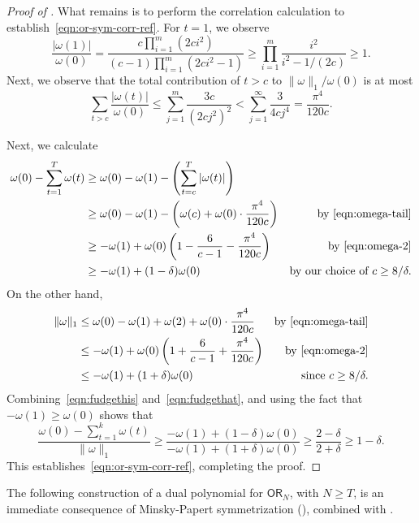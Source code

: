 \documentclass[11pt, letterpaper, fleqn]{article}
\theoremstyle{plain}
\newcommand{\OR}{\mathsf{ OR}}
\begin{document}
\begin{proof}[Proof of ]
What remains is to perform the correlation calculation to establish~\eqref{eqn:or-sym-corr-ref}. For $t = 1$, we observe
\[\frac{|\omega(1)|}{\omega(0)} = \frac{c\prod_{i = 1}^m (2ci^2)}{(c-1)\prod_{i = 1}^m (2ci^2 - 1)} \ge \prod_{i=1}^m \frac{i^2}{i^2 - 1/(2c)} \ge 1.\]
Next, we observe that the total contribution of $t > c$ to $\|\omega\|_1/\omega(0)$ is at most
\begin{equation} \label{eqn:omega-tail}
\sum_{t > c} \frac{|\omega(t)|}{\omega(0)} \le \sum_{j=1}^{m} \frac{3c}{(2cj^2)^2} < \sum_{j=1}^\infty \frac{3}{4cj^4} = \frac{\pi^4}{120 c}.
\end{equation}


Next, we calculate
\begin{align}
\omega(0) - \sum_{t = 1}^T \omega(t) &\ge \omega(0) - \omega(1) - \left( \sum_{t = c}^T |\omega(t)|\right) \nonumber \\
&\ge \omega(0) - \omega(1) - \left( \omega(c) +  \omega(0) \cdot \frac{\pi^4}{120c}\right) & \text{by } \eqref{eqn:omega-tail} \nonumber \\
&\ge - \omega(1) + \omega(0) \left(1 - \frac{6}{c-1} - \frac{\pi^4}{120c}\right) & \text{by } \eqref{eqn:omega-2} \nonumber \\
&\ge - \omega(1)  + (1 - \delta)\omega(0) & \text{by our choice of } c \ge 8/\delta. \label{eqn:fudgethis}
\end{align}
On the other hand,
\begin{align}
\|\omega\|_1 &\le \omega(0) - \omega(1) + \omega(2) + \omega(0) \cdot \frac{\pi^4}{120c} & \text{by } \eqref{eqn:omega-tail} \nonumber \\
&\le -\omega(1) + \omega(0) \left(1 + \frac{6}{c - 1} + \frac{\pi^4}{120c} \right) &\text{by } \eqref{eqn:omega-2}\nonumber \\
&\le -\omega(1) + (1 + \delta)\omega(0) & \text{since } c \ge 8/\delta. \label{eqn:fudgethat}
\end{align}
Combining~\eqref{eqn:fudgethis} and~\eqref{eqn:fudgethat}, and using the fact that $-\omega(1) \ge \omega(0)$ shows that
\[\frac{\omega(0) - \sum_{t = 1}^k \omega(t)}{\|\omega\|_1} \ge \frac{-\omega(1) + (1-\delta) \omega(0)}{-\omega(1) + (1+\delta) \omega(0)} \ge \frac{2-\delta}{2 + \delta} \ge 1 - \delta.\]
This establishes~\eqref{eqn:or-sym-corr-ref}, completing the proof.
\end{proof}


The following construction of a dual polynomial for $\OR_N$, with $N \ge T$, is an immediate consequence of Minsky-Papert symmetrization (), combined with . 
\end{document}
